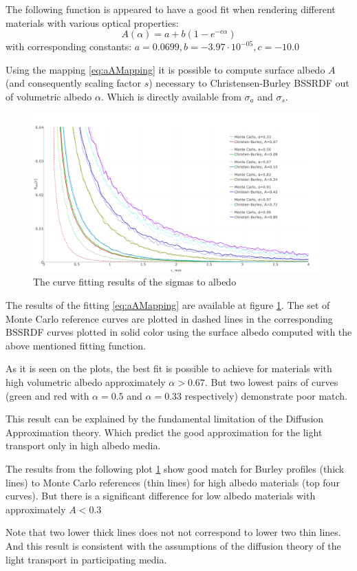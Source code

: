 The following function is appeared to have a good fit when rendering different materials with
various optical properties:
\begin{equation}
\label{eq:aAMapping}
A(\alpha) = a + b(1- e^{-c\alpha})
\end{equation}
with corresponding constants: $a = 0.0699, b = -3.97\cdot 10^{-05}, c =-10.0$

Using the mapping \ref{eq:aAMapping} it is possible to compute surface albedo $A$ (and consequently
scaling factor $s$) necessary to Christensen-Burley BSSRDF out of volumetric albedo $\alpha$. Which
is directly available from $\sigma_a$ and $\sigma_s$.

\begin{figure}
    \centering
    \includegraphics[width=0.98\textwidth]{imgs/plots/aA_fitting}
    \caption{The curve fitting results of the sigmas to albedo}
    \label{fig:albedo_fitting}
\end{figure}
The results of the fitting \ref{eq:aAMapping} are available at figure \ref{fig:albedo_fitting}. The
set of Monte Carlo reference curves are plotted in dashed lines in the corresponding BSSRDF curves
plotted in solid color using the surface albedo computed with the above mentioned fitting function.

As it is seen on the plots, the best fit is possible to achieve for materials with high volumetric
albedo approximately $\alpha>0.67$. But two lowest pairs of curves (green and red with
$\alpha=0.5$ and $\alpha=0.33$ respectively) demonstrate poor match.

This result can be explained by the fundamental limitation of the Diffusion Approximation theory.
Which predict the good approximation for the light transport only in high albedo media. 


The results from the following plot \ref{fig:albedo_fitting} show good match for
Burley profiles (thick lines) to Monte Carlo references (thin lines) for high albedo materials (top
four curves). But there is a significant difference for low albedo materials
with approximately $A<0.3$

Note that two lower thick lines does not not correspond to lower two thin lines.
And this result is consistent with the assumptions of the diffusion theory of
the light transport in participating media.
